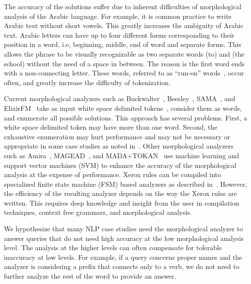 \documentclass[11pt]{article}
\begin{document}
\novocalize
The accuracy of the solutions suffer due to inherent difficulties
of morphological analysis of the Arabic language. 
For example, it is common practice to write Arabic text
without short vowels. 
This greatly increases the ambiguity of Arabic text. 
Arabic letters can have up to 
four different forms
corresponding to their position in a word, i.e, beginning,
middle, end of word and separate forms. 
This allows the phrase \transfalse
{} \transtrue
to be visually recognizable
as two separate words  (to) and  (the school) 
without the need of a space in between. 
The reason is the first word  ends with
 a non-connecting letter. 
These words,
referred to as ``run-on'' words~\cite{Buckwalter:04},
occur often, and greatly increase the
difficulty of tokenization.

Current morphological analyzers such as 
Buckwalter~,
Beesley~,
SAMA~\cite{Kulick:10},
and ElixirFM~\cite{Otakar:07} 
take as input white space delimited tokens~\cite{Kulick:10},
consider them as words,
and enumerate all possible solutions. 
This approach has several problems. 
First, a white space delimited token may have 
more than one word.
Second, the exhaustive enumeration may hurt performance and may
not be necessary or appropriate
in some case studies as noted in~\cite{Maamouri:10}. 
Other morphological analyzers such as 
Amira~\cite{Diab:07,Benajiba:07},
MAGEAD~\cite{Habash:05}, and MADA+TOKAN~\cite{Habash:09} 
use machine learning and support vector machines (SVM) 
to enhance the accuracy of the morphological analysis at the expense 
of performance.
Xerox rules can be compiled into specialized finite state
machine (FSM) based analyzers as described in~\cite{Beesley:03}.
However, the efficiency of the resulting analyzer depends on the
way the Xerox rules are written. 
This requires deep knowledge and insight from the user
in compilation techniques, context free grammars, 
and morphological analysis.

We hypothesize that many NLP case studies need the 
morphological analyzer to answer queries that do not need 
high accuracy at the low morphological analysis level.
The analysis at the higher levels can often compensate for 
tolerable inaccuracy at low levels. 
For example, if a query concerns proper names and the 
analyzer is considering a 
prefix that connects only to a verb,
we do not need to further analyze the rest of the word 
to provide an answer.
\end{document}
